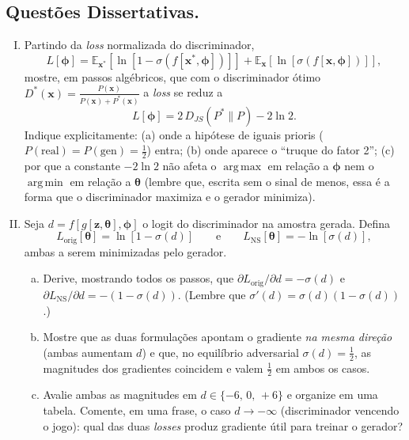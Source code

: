 \documentclass{dlproblemset}
\newcommand{\thetav}{\boldsymbol{\theta}}
\DeclareMathOperator*{\argmax}{arg\,max}
\DeclareMathOperator*{\argmin}{arg\,min}
\begin{document}
\newpage

\subsection*{Questões Dissertativas.}

\begin{enumerate}[I)]

\item Partindo da \emph{loss} normalizada do discriminador,
\[
  L[\boldsymbol{\phi}] = \mathbb{E}_{\mathbf{x}^{*}}\!\left[\ln[1 - \sigma(f[\mathbf{x}^{*},\boldsymbol{\phi}])]\right]
          + \mathbb{E}_{\mathbf{x}}\!\left[\ln[\sigma(f[\mathbf{x},\boldsymbol{\phi}])]\right],
\]
mostre, em passos algébricos, que com o discriminador ótimo $D^{*}(\mathbf{x}) = \tfrac{P(\mathbf{x})}{P(\mathbf{x}) + P^{*}(\mathbf{x})}$ a \emph{loss} se reduz a
\[
  L[\boldsymbol{\phi}] = 2\,D_{JS}(P^{*}\|P) - 2\ln 2.
\]
Indique explicitamente: (a) onde a hipótese de iguais prioris ($P(\text{real}) = P(\text{gen}) = \tfrac{1}{2}$) entra; (b) onde aparece o ``truque do fator 2''; (c) por que a constante $-2\ln 2$ não afeta o $\argmax$ em relação a $\boldsymbol{\phi}$ nem o $\argmin$ em relação a $\thetav$ (lembre que, escrita sem o sinal de menos, essa é a forma que o discriminador maximiza e o gerador minimiza).

\item {} Seja $d = f[g[\mathbf{z},\thetav],\boldsymbol{\phi}]$ o logit do discriminador na amostra gerada. Defina
\[
  L_{\text{orig}}[\thetav] = \ln[1 - \sigma(d)] \qquad\text{e}\qquad L_{\text{NS}}[\thetav] = -\ln[\sigma(d)],
\]
ambas a serem minimizadas pelo gerador.
\begin{enumerate}[(a)]
    \item Derive, mostrando todos os passos, que $\partial L_{\text{orig}}/\partial d = -\sigma(d)$ e $\partial L_{\text{NS}}/\partial d = -(1 - \sigma(d))$. (Lembre que $\sigma'(d) = \sigma(d)(1 - \sigma(d))$.)
    \item Mostre que as duas formulações apontam o gradiente \emph{na mesma direção} (ambas aumentam $d$) e que, no equilíbrio adversarial $\sigma(d) = \tfrac{1}{2}$, as magnitudes dos gradientes coincidem e valem $\tfrac{1}{2}$ em ambos os casos.
    \item Avalie ambas as magnitudes em $d \in \{-6,\, 0,\, +6\}$ e organize em uma tabela. Comente, em uma frase, o caso $d \to -\infty$ (discriminador vencendo o jogo): qual das duas \emph{losses} produz gradiente útil para treinar o gerador?
\end{enumerate}


\end{enumerate}
\end{document}
